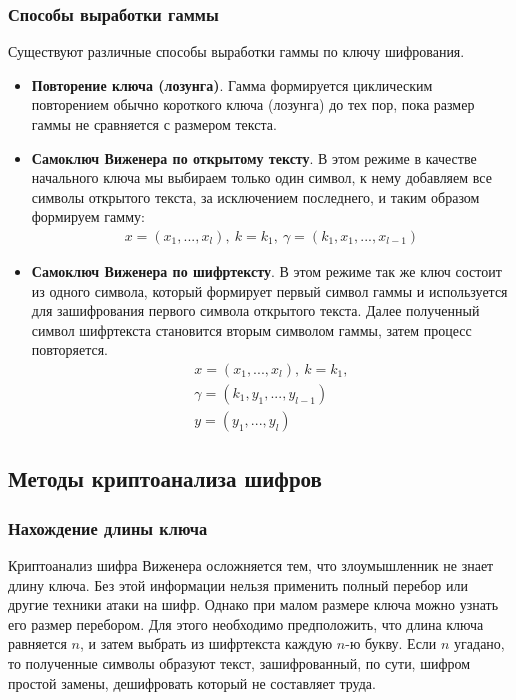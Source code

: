 \subsubsection{Способы выработки гаммы}
Существуют различные способы выработки гаммы по ключу шифрования.  
\begin{itemize}
    \item {\bf Повторение ключа (лозунга)}. Гамма формируется циклическим повторением обычно короткого ключа (лозунга) до тех пор, пока размер гаммы не сравняется с размером текста.
    \item {\bf Самоключ Виженера по открытому тексту}. В этом режиме в качестве начального ключа мы выбираем только один символ, к нему добавляем все символы открытого текста, за исключением последнего, и таким образом формируем гамму: 
    \begin{align*}
        x=(x_1, ..., x_l), \ k=k_1, \ \gamma=(k_1, x_1, ..., x_{l-1})
    \end{align*}
    \item {\bf Самоключ Виженера по шифртексту}. В этом режиме так же ключ состоит из одного символа, который формирует первый символ гаммы и используется для зашифрования первого символа открытого текста. Далее полученный символ шифртекста становится вторым символом гаммы, затем процесс повторяется. 
    \begin{gather*}
        x=(x_1, ..., x_l), \ k=k_1, \\
        \gamma=(k_1, y_1, ..., y_{l-1}) \\
        y=(y_1, ..., y_l)
    \end{gather*}
\end{itemize}



\subsection{Методы криптоанализа шифров}
\subsubsection{Нахождение длины ключа}
Криптоанализ шифра Виженера осложняется тем, что злоумышленник не знает длину ключа. Без этой информации нельзя применить полный перебор или другие техники атаки на шифр. Однако при малом размере ключа можно узнать его размер перебором. Для этого необходимо предположить, что длина ключа равняется $n$, и затем выбрать из шифртекста каждую $n$-ю букву. Если $n$ угадано, то полученные символы образуют текст, зашифрованный, по сути, шифром простой замены, дешифровать который не составляет труда. 

